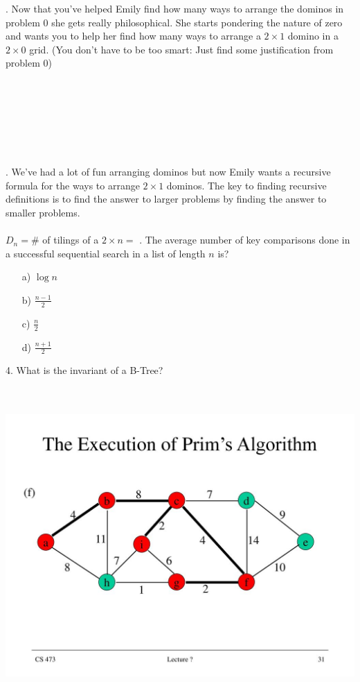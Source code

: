 \documentclass[12pt]{article}
\begin{document}
. Now that you've helped Emily find how many ways to arrange the dominos in problem 0 she gets really philosophical. She starts pondering the nature of zero and wants you to help her find how many ways to arrange a $2 \times 1$ domino in a $2 \times 0$ grid. (You don't have to be too smart: Just find some justification from problem 0)\\\\\\\\\\\\\\\\
. We've had a lot of fun arranging dominos but now Emily wants a recursive formula for the ways to arrange $2 \times 1$ dominos. The key to finding recursive definitions is to find the answer to larger problems by finding the answer to smaller problems.\\\\
$D_n = $\# of tilings of a $2 \times n =$
\newpage
{}. The average number of key comparisons done in a successful sequential search in a list of length $n$ is?
\begin{enumerate}
    \item[a)]$\log{n}$
    \item[b)]$\frac{n-1}{2}$
    \item[c)]$\frac{n}{2}$
    \item[d)]$\frac{n+1}{2}$
\end{enumerate}
4. What is the invariant of a B-Tree?\\\\\\
\centerline{\includegraphics[scale=0.9]{prim.jpg}}
\end{document}

